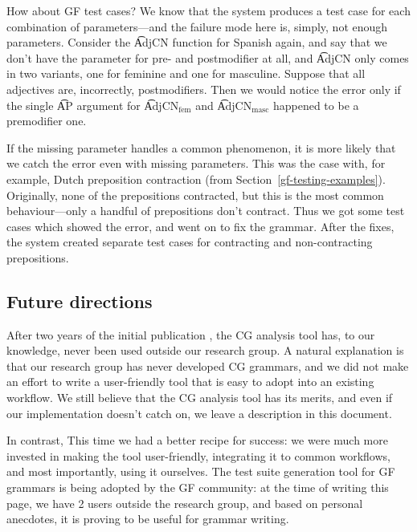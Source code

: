 How about GF test cases? We know that the system produces a test case
for each combination of parameters---and the failure mode here is,
simply, not enough parameters.  Consider the \t{AdjCN} function for
Spanish again, and say that we don’t have the parameter for pre- and
postmodifier at all, and \t{AdjCN} only comes in two variants, one for
feminine and one for masculine. Suppose that all adjectives are,
incorrectly, postmodifiers. Then we would notice the error only if the
single \t{AP} argument for \t{AdjCN$_{\text{fem}}$} and
\t{AdjCN$_{\text{masc}}$} happened to be a premodifier one.

If the missing parameter handles a common phenomenon, it is more
likely that we catch the error even with missing parameters. This was
the case with, for example, Dutch preposition contraction (from
Section~\ref{gf-testing-examples}). Originally, none of the
prepositions contracted, but this is the most common behaviour---only a
handful of prepositions don’t contract. Thus we got some test cases
which showed the error, and went on to fix the grammar. After the
fixes, the system created separate test cases for contracting and
non-contracting prepositions.

\subsection{Future directions}

After two years of the initial publication
\cite{listenmaa_claessen2016}, the CG analysis tool has, to our
knowledge, never been used outside our research group. A natural
explanation is that our research group has never developed CG
grammars, and we did not make an effort to write a user-friendly tool
that is easy to adopt into an existing workflow.  We still believe
that the CG analysis tool has its merits, and even if our
implementation doesn't catch on, we leave a description in this
document.

In contrast, This time we had a better recipe for success: we were
much more invested in making the tool user-friendly, integrating it to
common workflows, and most importantly, using it ourselves.  The test
suite generation tool for GF grammars is being adopted by the GF
community: at the time of writing this page, we have 2 users outside
the research group, and based on personal anecdotes, it is proving to
be useful for grammar writing.

